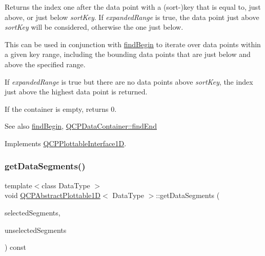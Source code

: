 Returns the index one after the data point with a (sort-\/)key that is equal to, just above, or just below {\itshape sort\+Key}. If {\itshape expanded\+Range} is true, the data point just above {\itshape sort\+Key} will be considered, otherwise the one just below.

This can be used in conjunction with \hyperlink{class_q_c_p_abstract_plottable1_d_ae6ead74a0d6a17954e1857f361b9ccf2}{find\+Begin} to iterate over data points within a given key range, including the bounding data points that are just below and above the specified range.

If {\itshape expanded\+Range} is true but there are no data points above {\itshape sort\+Key}, the index just above the highest data point is returned.

If the container is empty, returns 0.

\begin{DoxySeeAlso}{See also}
\hyperlink{class_q_c_p_abstract_plottable1_d_ae6ead74a0d6a17954e1857f361b9ccf2}{find\+Begin}, \hyperlink{class_q_c_p_data_container_afb8b8f23cc2b7234a793a25ce79fe48f}{Q\+C\+P\+Data\+Container\+::find\+End} 
\end{DoxySeeAlso}


Implements \hyperlink{class_q_c_p_plottable_interface1_d_a5deced1016bc55a41a2339619045b295}{Q\+C\+P\+Plottable\+Interface1D}.

\mbox{\label{class_q_c_p_abstract_plottable1_d_ae890e62ce403c54f575c73b9529f1af8}} 
\subsubsection{\texorpdfstring{get\+Data\+Segments()}{getDataSegments()}}
{\footnotesize\ttfamily template$<$class Data\+Type $>$ \\
void \hyperlink{class_q_c_p_abstract_plottable1_d}{Q\+C\+P\+Abstract\+Plottable1D}$<$ Data\+Type $>$\+::get\+Data\+Segments (\begin{DoxyParamCaption}\item[{Q\+List$<$ \hyperlink{class_q_c_p_data_range}{Q\+C\+P\+Data\+Range} $>$ \&}]{selected\+Segments,  }\item[{Q\+List$<$ \hyperlink{class_q_c_p_data_range}{Q\+C\+P\+Data\+Range} $>$ \&}]{unselected\+Segments }\end{DoxyParamCaption}) const\hspace{0.3cm}{\ttfamily [protected]}}

